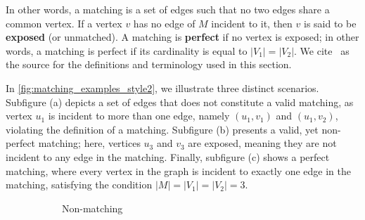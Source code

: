 In other words, a matching is a set of edges such that no two edges share a common vertex. If a vertex $v$ has no edge of $M$ incident to it, then $v$ is said to be \textbf{exposed} (or unmatched). A matching is \textbf{perfect} if no vertex is exposed; in other words, a matching is perfect if its cardinality is equal to $|V_1| = |V_2|$. We cite~\cite{goemans2009matching} as the source for the definitions and terminology used in this section.

\begin{example}
    In \cref{fig:matching_examples_style2}, we illustrate three distinct scenarios. Subfigure (a) depicts a set of edges that does not constitute a valid matching, as vertex $u_1$ is incident to more than one edge, namely $(u_1, v_1)$ and $(u_1, v_2)$, violating the definition of a matching. Subfigure (b) presents a valid, yet non-perfect matching; here, vertices $u_3$ and $v_3$ are exposed, meaning they are not incident to any edge in the matching. Finally, subfigure (c) shows a perfect matching, where every vertex in the graph is incident to exactly one edge in the matching, satisfying the condition $|M| = |V_1| = |V_2| = 3$.
    \begin{figure}[H]
        \centering
        \begin{subfigure}[b]{0.3\textwidth}
            \centering
            \caption{Non-matching}
            \label{fig:not_a_matching_style2}
        \end{subfigure}
        \hfill
        \begin{subfigure}[b]{0.3\textwidth}
            \centering
\end{subfigure}
\end{figure}
\end{example}
